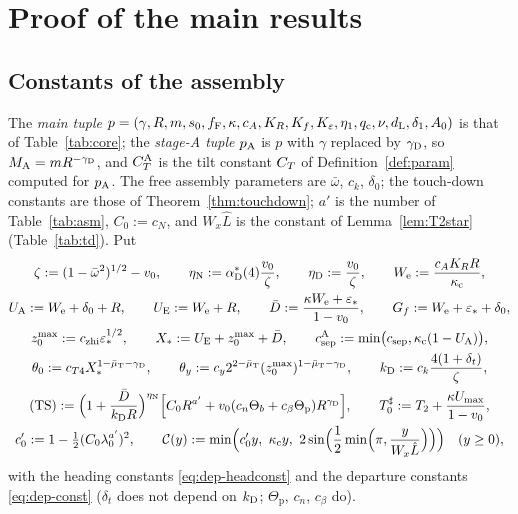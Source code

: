 \section{Proof of the main results}\label{sec:proof}

\subsection{Constants of the assembly}\label{sec:asmconst}

The \emph{main tuple} $p=(\gamma,R,m,s_0,f_{\mathrm F},\kappa,c_A,K_R,K_f,K_\varepsilon,\eta_1,q_{\mathrm c},\nu,d_{\mathrm L},\delta_1,A_0)$ is that of
Table~\ref{tab:core}; the \emph{stage-A tuple} $p_{\mathrm A}$ is $p$ with $\gamma$ replaced by $\gamma_{\mathrm D}$, so $M_{\mathrm A}=mR^{-\gamma_{\mathrm D}}$, and
$C_T^{\mathrm A}$ is the tilt constant $C_T$ of Definition~\ref{def:param} computed for $p_{\mathrm A}$. The free
assembly parameters are $\bar\omega$, $c_k$, $\delta_0$; the touch-down constants are those of Theorem~\ref{thm:touchdown}; $a'$ is the
number of Table~\ref{tab:asm}, $C_0:=c_N$, and $W_x\hat L$ is the constant of Lemma~\ref{lem:T2star} (Table~\ref{tab:td}). Put
\begin{equation}\label{eq:asm}
\begin{gathered}
\zeta:=(1-\bar\omega^2)^{1/2}-v_0,\qquad\eta_{\mathrm N}:=\alpha^*_{\mathrm D}(4)\frac{v_0}\zeta,\qquad\eta_{\mathrm D}:=\frac{v_0}\zeta,\qquad
W_{\mathrm e}:=\frac{c_AK_RR}{\kappa_{\mathrm c}},\\
U_{\mathrm A}:=W_{\mathrm e}+\delta_0+R,\qquad U_{\mathrm E}:=W_{\mathrm e}+R,\qquad
\bar D:=\frac{\kappa W_{\mathrm e}+\varepsilon_*}{1-v_0},\qquad G_f:=W_{\mathrm e}+\varepsilon_*+\delta_0,\\
z_0^{\max}:=c_{\mathrm{zhi}}\varepsilon_*^{1/2},\qquad X_*:=U_{\mathrm E}+z_0^{\max}+\bar D,\qquad
c_{\mathrm{sep}}^{\mathrm A}:=\min\bigl(c_{\mathrm{sep}},\kappa_{\mathrm c}(1-U_{\mathrm A})\bigr),\\
\theta_0:=c_{T4}X_*^{1-\bar\mu_{\mathrm T}-\gamma_{\mathrm D}},\qquad\theta_y:=c_y2^{2-\bar\mu_{\mathrm T}}(z_0^{\max})^{1-\bar\mu_{\mathrm T}-\gamma_{\mathrm D}},\qquad
k_{\mathrm D}:=c_k\frac{4(1+\delta_t)}\zeta,\\
\mathrm{(TS)}:=\Bigl(1+\frac{\bar D}{k_{\mathrm D} R}\Bigr)^{\eta_{\mathrm N}}\Bigl[C_0R^{a'}+v_0(c_n\Theta_b+c_\beta\Theta_{\mathrm p})R^{\gamma_{\mathrm D}}\Bigr],\qquad
T_0^\sharp:=T_2+\frac{\kappa U_{\max}}{1-v_0},\\
c_0':=1-\tfrac12(C_0\lambda_0^{a'})^2,\qquad
\mathcal C(y):=\min\Bigl(c_0'y,\ \kappa_{\mathrm c} y,\ 2\sin\Bigl(\frac12\min\Bigl(\pi,\frac y{W_x\hat L}\Bigr)\Bigr)\Bigr)\quad(y\ge0),
\end{gathered}
\end{equation}
with the heading constants \eqref{eq:dep-headconst} and the departure constants \eqref{eq:dep-const} ($\delta_t$ does not depend on
$k_{\mathrm D}$; $\Theta_{\mathrm p}$, $c_n$, $c_\beta$ do).

